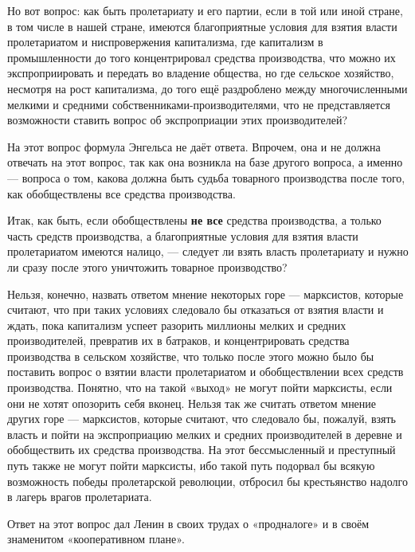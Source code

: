 \documentclass[12pt, a4paper, openany]{book}
\begin{document}
Но вот вопрос: как быть пролетариату и его партии, если в той или иной стране, в том числе в нашей стране, имеются благоприятные условия для взятия власти пролетариатом и ниспровержения капитализма, где капитализм в промышленности до того концентрировал средства производства, что можно их экспроприировать и передать во владение общества, но где сельское хозяйство, несмотря на рост капитализма, до того ещё раздроблено между многочисленными мелкими и средними собственниками-производителями, что не представляется возможности ставить вопрос об экспроприации этих производителей?

На этот вопрос формула Энгельса не даёт ответа. Впрочем, она и не должна отвечать на этот вопрос, так как она возникла на базе другого вопроса, а именно — вопроса о том, какова должна быть судьба товарного производства после того, как обобществлены все средства производства.



Итак, как быть, если обобществлены \textbf{не все} средства производства, а только часть средств производства, а благоприятные условия для взятия власти пролетариатом имеются налицо, — следует ли взять власть пролетариату и нужно ли сразу после этого уничтожить товарное производство?



Нельзя, конечно, назвать ответом мнение некоторых горе — марксистов, которые считают, что при таких условиях следовало бы отказаться от взятия власти и ждать, пока капитализм успеет разорить миллионы мелких и средних производителей, превратив их в батраков, и концентрировать средства производства в сельском хозяйстве, что только после этого можно было бы поставить вопрос о взятии власти пролетариатом и обобществлении всех средств производства. Понятно, что на такой «выход» не могут пойти марксисты, если они не хотят опозорить себя вконец. Нельзя так же считать ответом мнение других горе — марксистов, которые считают, что следовало бы, пожалуй, взять власть и пойти на экспроприацию мелких и средних производителей в деревне и обобществить их средства производства. На этот бессмысленный и преступный путь также не могут пойти марксисты, ибо такой путь подорвал бы всякую возможность победы пролетарской революции, отбросил бы крестьянство надолго в лагерь врагов пролетариата.



Ответ на этот вопрос дал Ленин в своих трудах о «продналоге» и в своём знаменитом «кооперативном плане».
\end{document}
